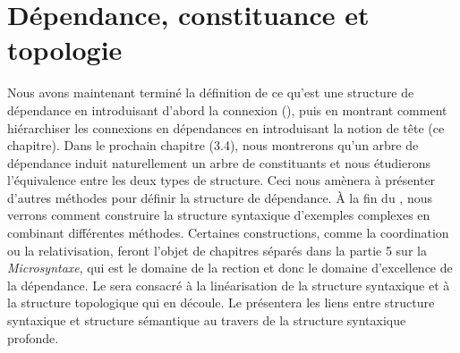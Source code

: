 \section{Dépendance, constituance et topologie}\label{sec:3.3.34}

Nous avons maintenant terminé la définition de ce qu’est une structure de dépendance en introduisant d’abord la connexion (), puis en montrant comment hiérarchiser les connexions en dépendances en introduisant la notion de tête (ce chapitre). Dans le prochain chapitre (3.4), nous montrerons qu’un arbre de dépendance induit naturellement un arbre de constituants et nous étudierons l’équivalence entre les deux types de structure. Ceci nous amènera à présenter d’autres méthodes pour définir la structure de dépendance. À la fin du , nous verrons comment construire la structure syntaxique d’exemples complexes en combinant différentes méthodes. Certaines constructions, comme la coordination ou la relativisation, feront l’objet de chapitres séparés dans la partie 5 sur la \textit{Microsyntaxe}, qui est le domaine de la rection et donc le domaine d’excellence de la dépendance. Le  sera consacré à la linéarisation de la structure syntaxique et à la structure topologique qui en découle. Le  présentera les liens entre structure syntaxique et structure sémantique au travers de la structure syntaxique profonde.

